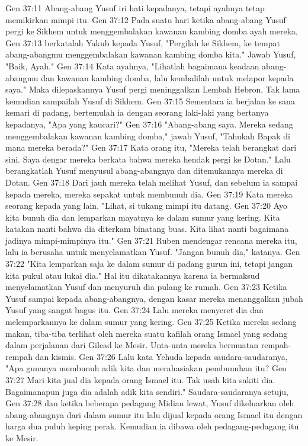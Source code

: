Gen 37:11  Abang-abang Yusuf iri hati kepadanya, tetapi ayahnya tetap memikirkan mimpi itu.
Gen 37:12  Pada suatu hari ketika abang-abang Yusuf pergi ke Sikhem untuk menggembalakan kawanan kambing domba ayah mereka,
Gen 37:13  berkatalah Yakub kepada Yusuf, "Pergilah ke Sikhem, ke tempat abang-abangmu menggembalakan kawanan kambing domba kita." Jawab Yusuf, "Baik, Ayah."
Gen 37:14  Kata ayahnya, "Lihatlah bagaimana keadaan abang-abangmu dan kawanan kambing domba, lalu kembalilah untuk melapor kepada saya." Maka dilepaskannya Yusuf pergi meninggalkan Lembah Hebron. Tak lama kemudian sampailah Yusuf di Sikhem.
Gen 37:15  Sementara ia berjalan ke sana kemari di padang, bertemulah ia dengan seorang laki-laki yang bertanya kepadanya, "Apa yang kaucari?"
Gen 37:16  "Abang-abang saya. Mereka sedang menggembalakan kawanan kambing domba," jawab Yusuf, "Tahukah Bapak di mana mereka berada?"
Gen 37:17  Kata orang itu, "Mereka telah berangkat dari sini. Saya dengar mereka berkata bahwa mereka hendak pergi ke Dotan." Lalu berangkatlah Yusuf menyusul abang-abangnya dan ditemukannya mereka di Dotan.
Gen 37:18  Dari jauh mereka telah melihat Yusuf, dan sebelum ia sampai kepada mereka, mereka sepakat untuk membunuh dia.
Gen 37:19  Kata mereka seorang kepada yang lain, "Lihat, si tukang mimpi itu datang.
Gen 37:20  Ayo kita bunuh dia dan lemparkan mayatnya ke dalam sumur yang kering. Kita katakan nanti bahwa dia diterkam binatang buas. Kita lihat nanti bagaimana jadinya mimpi-mimpinya itu."
Gen 37:21  Ruben mendengar rencana mereka itu, lalu ia berusaha untuk menyelamatkan Yusuf. "Jangan bunuh dia," katanya.
Gen 37:22  "Kita lemparkan saja ke dalam sumur di padang gurun ini, tetapi jangan kita pukul atau lukai dia." Hal itu dikatakannya karena ia bermaksud menyelamatkan Yusuf dan menyuruh dia pulang ke rumah.
Gen 37:23  Ketika Yusuf sampai kepada abang-abangnya, dengan kasar mereka menanggalkan jubah Yusuf yang sangat bagus itu.
Gen 37:24  Lalu mereka menyeret dia dan melemparkannya ke dalam sumur yang kering.
Gen 37:25  Ketika mereka sedang makan, tiba-tiba terlihat oleh mereka suatu kafilah orang Ismael yang sedang dalam perjalanan dari Gilead ke Mesir. Unta-unta mereka bermuatan rempah-rempah dan kismis.
Gen 37:26  Lalu kata Yehuda kepada saudara-saudaranya, "Apa gunanya membunuh adik kita dan merahasiakan pembunuhan itu?
Gen 37:27  Mari kita jual dia kepada orang Ismael itu. Tak usah kita sakiti dia. Bagaimanapun juga dia adalah adik kita sendiri." Saudara-saudaranya setuju,
Gen 37:28  dan ketika beberapa pedagang Midian lewat, Yusuf dikeluarkan oleh abang-abangnya dari dalam sumur itu lalu dijual kepada orang Ismael itu dengan harga dua puluh keping perak. Kemudian ia dibawa oleh pedagang-pedagang itu ke Mesir.
